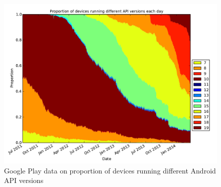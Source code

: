 \documentclass[conference,a4paper,twoside]{IEEEtran}
\begin{document}
\begin{figure}
 \centering
 \includegraphics[width=\columnwidth]{figures/da_norm_api}
 \caption{Google Play data on proportion of devices running different Android API versions}
 \label{fig:da_api}
\end{figure}
\end{document}

